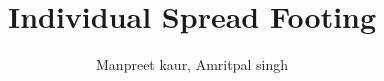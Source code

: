 \title{Individual Spread Footing}
\author{Manpreet kaur, Amritpal singh}
\begin{titlepage}
     \maketitle
    \tableofcontents
\end{titlepage}

